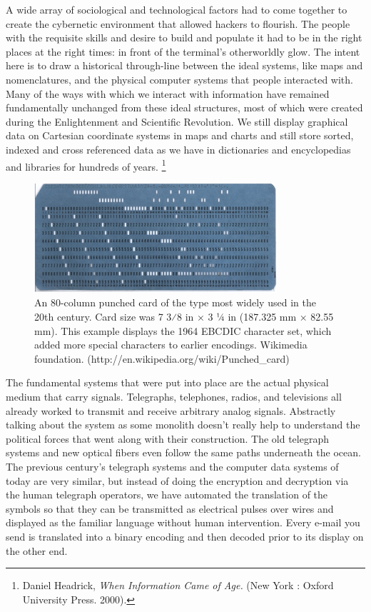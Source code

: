 \documentclass[11pt]{article}
\begin{document}
A wide array of sociological and technological factors had to come together to create the cybernetic environment that allowed hackers to flourish. The people with the requisite skills and desire to build and populate it had to be in the right places at the right times: in front of the terminal's otherworldly glow. The intent here is to draw a historical through-line between the ideal systems, like maps and nomenclatures, and the physical computer systems that people interacted with. Many of the ways with which we interact with information have remained fundamentally unchanged from these ideal structures,  most of which were created during the Enlightenment and Scientific Revolution. We still display graphical data on Cartesian coordinate systems in maps and charts and still store sorted, indexed and cross referenced data as we have in dictionaries and encyclopedias and libraries for hundreds of years.
\footnote{Daniel Headrick, \emph{When Information Came of Age.} (New York : Oxford University Press. 2000).}

\begin{figure}[ht!]
\center
\includegraphics[width=90mm]{500px-Blue-punch-card-front-horiz.png}
\caption{An 80-column punched card of the type most widely used in the 20th century. Card size was 7 3⁄8 in × 3 1⁄4 in (187.325 mm × 82.55 mm). This example displays the 1964 EBCDIC character set, which added more special characters to earlier encodings. Wikimedia foundation. (http://en.wikipedia.org/wiki/Punched\_card) }
\end{figure}

The fundamental systems that were put into place are the actual physical medium that carry signals. Telegraphs, telephones, radios, and televisions all already worked to transmit and receive arbitrary analog signals. Abstractly talking about the system as some monolith doesn't really help to understand the political forces that went along with their construction. The old telegraph systems and new optical fibers even follow the same paths underneath the ocean. The previous century's telegraph systems and the computer data systems of today are very similar, but instead of doing the encryption and decryption via the human telegraph operators, we have automated the translation of the symbols so that they can be transmitted as electrical pulses over wires and displayed as the familiar language without human intervention. Every e-mail you send is translated into a binary encoding and then decoded prior to its display on the other end.
\end{document}
